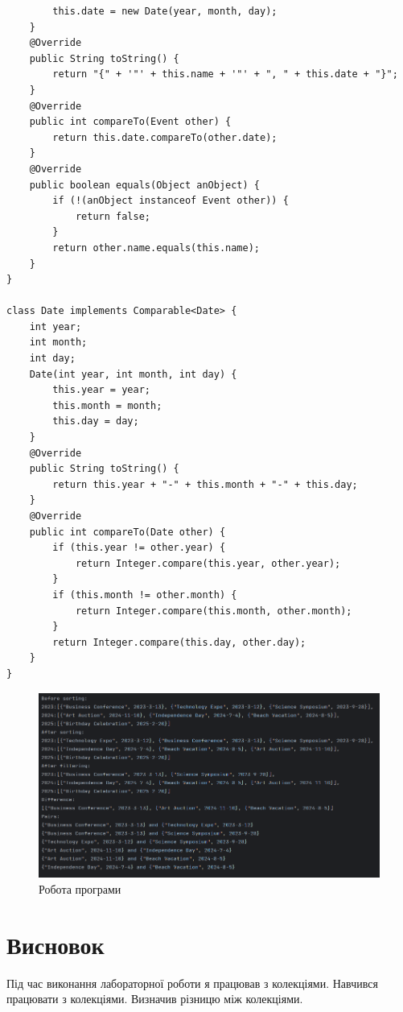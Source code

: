 \documentclass[14pt]{extreport}
\begin{document}
\begin{normalsize}
\begin{lstlisting}
		this.date = new Date(year, month, day);
	}
	@Override
	public String toString() {
		return "{" + '"' + this.name + '"' + ", " + this.date + "}";
	}
	@Override
	public int compareTo(Event other) {
		return this.date.compareTo(other.date);
	}
	@Override
	public boolean equals(Object anObject) {
		if (!(anObject instanceof Event other)) {
			return false;
		}
		return other.name.equals(this.name);
	}
}

class Date implements Comparable<Date> {
	int year;
	int month;
	int day;
	Date(int year, int month, int day) {
		this.year = year;
		this.month = month;
		this.day = day;
	}
	@Override
	public String toString() {
		return this.year + "-" + this.month + "-" + this.day;
	}
	@Override
	public int compareTo(Date other) {
		if (this.year != other.year) {
			return Integer.compare(this.year, other.year);
		}
		if (this.month != other.month) {
			return Integer.compare(this.month, other.month);
		}
		return Integer.compare(this.day, other.day);
	}
}
	\end{lstlisting}	
	
	
	
	\begin{figure}[H]
		\centering
		\includegraphics[scale=0.55]{1}
		\caption{Робота програми}
	\end{figure}

	\section*{Висновок}
	Під час виконання лабораторної роботи я працював з колекціями. Навчився працювати з колекціями. Визначив різницю між колекціями.
	 
\end{normalsize}
\end{document}
